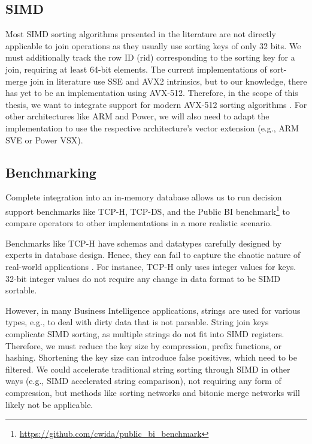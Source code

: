\subsection{SIMD}

Most SIMD sorting algorithms presented in the literature are not directly applicable to join
operations as they usually use sorting keys of only 32 bits. We must additionally track the row ID
(rid) corresponding to the sorting key for a join, requiring at least 64-bit elements. The current
implementations of sort-merge join in literature use SSE and AVX2 intrinsics, but to our knowledge,
there has yet to be an implementation using AVX-512. Therefore, in the scope of this thesis, we want 
to integrate support for modern AVX-512 sorting algorithms \cite{Watkins, 8855628}. For other architectures like
ARM and Power, we will also need to adapt the implementation to use the respective architecture's
vector extension (e.g., ARM SVE or Power VSX). 

\subsection{Benchmarking}
Complete integration into an in-memory database allows us to run decision support benchmarks
like TCP-H, TCP-DS, and the Public BI benchmark\footnote{\url{https://github.com/cwida/public_bi_benchmark}} 
to compare operators to other implementations in a 
more realistic scenario.

Benchmarks like TCP-H have schemas and datatypes carefully designed by experts in database design.
Hence, they can fail to capture the chaotic nature of real-world applications \cite{10.1145/3209950.3209952}.
For instance, TCP-H only uses integer values for keys. 32-bit integer values do not require any change
in data format to be SIMD sortable.

However, in many Business Intelligence applications, strings
are used for various types, e.g., to deal with dirty data that is not parsable. String join keys
complicate SIMD sorting, as multiple strings do not fit into SIMD registers. Therefore, we must
reduce the key size by compression, prefix functions, or hashing. Shortening the key size can
introduce false positives, which need to be filtered. We could accelerate traditional string
sorting through SIMD in other ways (e.g., SIMD accelerated string comparison), not requiring any
form of compression, but methods like sorting networks and bitonic merge networks will likely not
be applicable.

